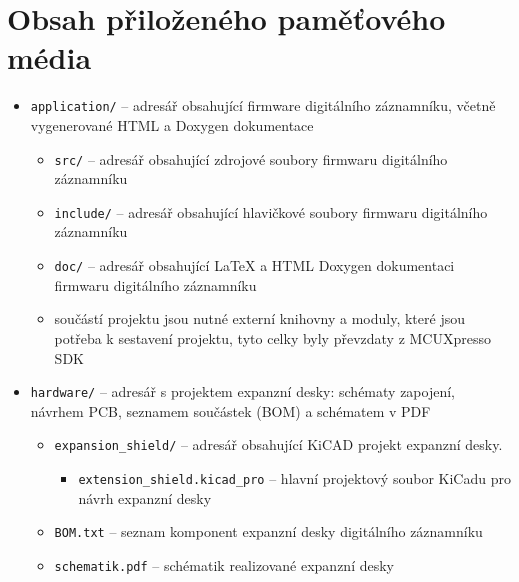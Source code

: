 
%

\chapter{Obsah přiloženého paměťového média}

\begin{itemize}
    \item \texttt{application/} -- adresář obsahující firmware digitálního záznamníku, včetně vygenerované HTML a Doxygen dokumentace
    \begin{itemize}
        \item \texttt{src/} -- adresář obsahující zdrojové soubory firmwaru digitálního záznamníku
        \item \texttt{include/} -- adresář obsahující hlavičkové soubory firmwaru digitálního záznamníku
        \item \texttt{doc/} -- adresář obsahující LaTeX a HTML Doxygen dokumentaci firmwaru digitálního záznamníku
        \item součástí projektu jsou nutné externí knihovny a moduly, které jsou potřeba k sestavení projektu, tyto celky byly převzdaty z MCUXpresso SDK
    \end{itemize}
    \item \texttt{hardware/} -- adresář s projektem expanzní desky: schématy zapojení, návrhem PCB, seznamem součástek (BOM) a schématem v PDF

    \begin{itemize}
        \item \texttt{expansion_shield/} -- adresář obsahující KiCAD projekt expanzní desky.
        \begin{itemize}
            \item \texttt{extension\_shield.kicad\_pro} -- hlavní projektový soubor KiCadu pro návrh expanzní desky
        \end{itemize}
        \item \texttt{BOM.txt} -- seznam komponent expanzní desky digitálního záznamníku
        \item \texttt{schematik.pdf} -- schématik realizované expanzní desky
    \end{itemize}


\end{itemize}
